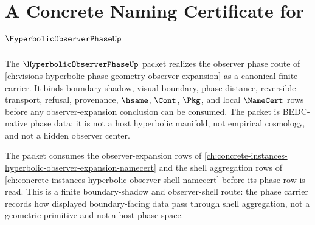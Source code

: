 \chapter{A Concrete Naming Certificate for $\HyperbolicObserverPhaseUp$}
\label{ch:concrete-instances-hyperbolic-observer-phase-namecert}

The $\HyperbolicObserverPhaseUp$ packet realizes the observer phase route of \autoref{ch:visions-hyperbolic-phase-geometry-observer-expansion} as a canonical finite carrier. It binds boundary-shadow, visual-boundary, phase-distance, reversible-transport, refusal, provenance, $\hsame$, $\Cont$, $\Pkg$, and local $\NameCert$ rows before any observer-expansion conclusion can be consumed. The packet is BEDC-native phase data: it is not a host hyperbolic manifold, not empirical cosmology, and not a hidden observer center.

The packet consumes the observer-expansion rows of \autoref{ch:concrete-instances-hyperbolic-observer-expansion-namecert} and the shell aggregation rows of \autoref{ch:concrete-instances-hyperbolic-observer-shell-namecert} before its phase row is read. This is a finite boundary-shadow and observer-shell route: the phase carrier records how displayed boundary-facing data pass through shell aggregation, not a geometric primitive and not a host phase space.

